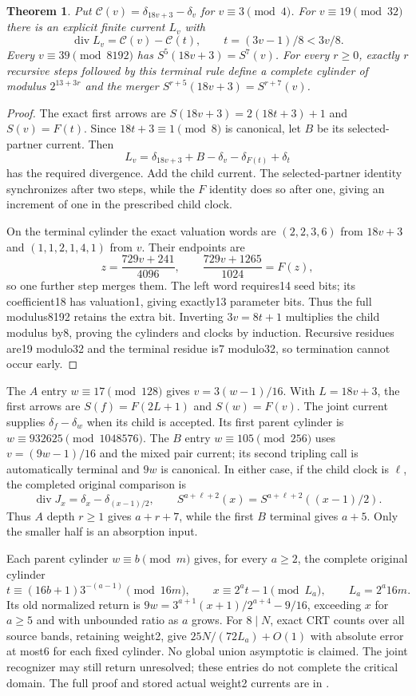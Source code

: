 \documentclass[11pt]{article}
\newtheorem{theorem}{Theorem}
\begin{document}
\begin{theorem}\label{thm:coupledeven}
Put $\mathcal C(v)=\delta_{18v+3}-\delta_v$ for $v\equiv3\pmod4$.
For $v\equiv19\pmod{32}$ there is an explicit finite current $L_v$ with
\[
 \operatorname{div}L_v=\mathcal C(v)-\mathcal C(t),
 \qquad t=(3v-1)/8<3v/8.
\]
Every $v\equiv39\pmod{8192}$ has
$S^5(18v+3)=S^7(v)$. For every $r\ge0$, exactly $r$ recursive
steps followed by this terminal rule define a complete cylinder of
modulus $2^{13+3r}$ and the merger
$S^{r+5}(18v+3)=S^{r+7}(v)$.
\end{theorem}
\begin{proof}
The exact first arrows are
$S(18v+3)=2(18t+3)+1$ and $S(v)=F(t)$.
Since $18t+3\equiv1\pmod8$ is canonical, let $B$ be its selected-partner
current. Then
\[
 L_v=\delta_{18v+3}+B-\delta_v-\delta_{F(t)}+\delta_t
\]
has the required divergence. Add the child current. The selected-partner
identity synchronizes after two steps, while the $F$ identity does so
after one, giving an increment of one in the prescribed child clock.

On the terminal cylinder the exact valuation words are $(2,2,3,6)$
from $18v+3$ and $(1,1,2,1,4,1)$ from $v$. Their endpoints are
\[
 z=\frac{729v+241}{4096},\qquad
 \frac{729v+1265}{1024}=F(z),
\]
so one further step merges them. The left word requires14 seed bits;
its coefficient18 has valuation1, giving exactly13 parameter bits.
Thus the full modulus8192 retains the extra bit. Inverting
$3v=8t+1$ multiplies the child modulus by8, proving the cylinders
and clocks by induction. Recursive residues are19 modulo32 and
the terminal residue is7 modulo32, so termination cannot occur early.
\end{proof}

The $A$ entry $w\equiv17\pmod{128}$ gives $v=3(w-1)/16$.
With $L=18v+3$, the first arrows are
$S(f)=F(2L+1)$ and $S(w)=F(v)$. The joint current supplies
$\delta_f-\delta_w$ when its child is accepted. Its first parent
cylinder is $w\equiv932625\pmod{1048576}$.
The $B$ entry $w\equiv105\pmod{256}$ uses
$v=(9w-1)/16$ and the mixed pair current; its second tripling call is
automatically terminal and $9w$ is canonical.
In either case, if the child clock is $\ell$, the completed original
comparison is
\[
 \operatorname{div}J_x=\delta_x-\delta_{(x-1)/2},\qquad
 S^{a+\ell+2}(x)=S^{a+\ell+2}((x-1)/2).
\]
Thus $A$ depth $r\ge1$ gives $a+r+7$, while the first $B$ terminal
gives $a+5$. Only the smaller half is an absorption input.

Each parent cylinder $w\equiv b\pmod m$ gives, for every $a\ge2$,
the complete original cylinder
\[
 t\equiv(16b+1)3^{-(a-1)}\pmod{16m},\qquad
 x\equiv2^at-1\pmod{L_a},\qquad L_a=2^a16m.
\]
Its old normalized return is
$9w=3^{a+1}(x+1)/2^{a+4}-9/16$, exceeding $x$ for $a\ge5$
and with unbounded ratio as $a$ grows.
For $8\mid N$, exact CRT counts over all source bands, retaining weight2, give
$25N/(72L_a)+O(1)$ with absolute error at most6 for each fixed
cylinder. No global union asymptotic is claimed.
The joint recognizer may still return unresolved; these entries do not
complete the critical domain. The full proof and stored actual weight2
currents are in
.
\end{document}
